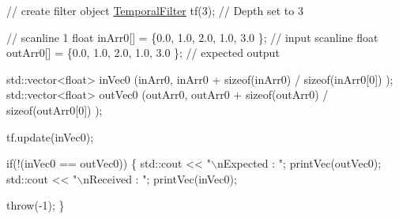 \begin{DoxyCodeInclude}
    \textcolor{comment}{// create filter object}
    \hyperlink{class_temporal_filter}{TemporalFilter} tf(3); \textcolor{comment}{// Depth set to 3}
    
    \textcolor{comment}{// scanline 1}
    \textcolor{keywordtype}{float} inArr0[] = \{0.0, 1.0, 2.0, 1.0, 3.0 \};  \textcolor{comment}{// input scanline}
    \textcolor{keywordtype}{float} outArr0[] = \{0.0, 1.0, 2.0, 1.0, 3.0 \}; \textcolor{comment}{// expected output}
    
    std::vector<float> inVec0 (inArr0, inArr0 + \textcolor{keyword}{sizeof}(inArr0) / \textcolor{keyword}{sizeof}(inArr0[0]) );
    std::vector<float> outVec0 (outArr0, outArr0 + \textcolor{keyword}{sizeof}(outArr0) / \textcolor{keyword}{sizeof}(outArr0[0]) );
    
    tf.update(inVec0);
    
    \textcolor{keywordflow}{if}(!(inVec0 == outVec0)) \{
        std::cout << \textcolor{stringliteral}{"\(\backslash\)nExpected : "}; printVec(outVec0);
        std::cout << \textcolor{stringliteral}{"\(\backslash\)nReceived : "}; printVec(inVec0);
        
        \textcolor{keywordflow}{throw}(-1);
    \}
    
\end{DoxyCodeInclude}
